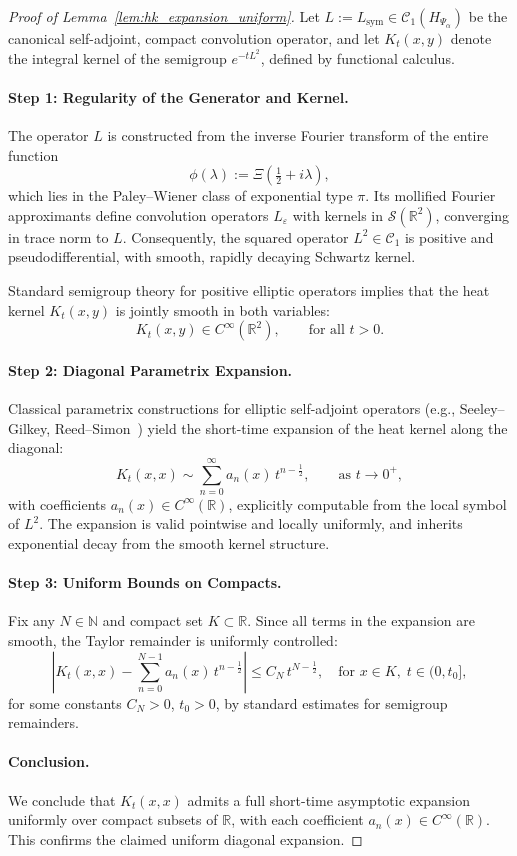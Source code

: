 \begin{proof}[Proof of Lemma~\ref{lem:hk_expansion_uniform}]
Let \( L := L_{\mathrm{sym}} \in \mathcal{C}_1(H_{\Psi_\alpha}) \) be the canonical self-adjoint, compact convolution operator, and let \( K_t(x,y) \) denote the integral kernel of the semigroup \( e^{-tL^2} \), defined by functional calculus.

\paragraph{Step 1: Regularity of the Generator and Kernel.}
The operator \( L \) is constructed from the inverse Fourier transform of the entire function
\[
\phi(\lambda) := \Xi\left(\tfrac{1}{2} + i\lambda\right),
\]
which lies in the Paley–Wiener class of exponential type \( \pi \). Its mollified Fourier approximants define convolution operators \( L_\varepsilon \) with kernels in \( \mathcal{S}(\mathbb{R}^2) \), converging in trace norm to \( L \). Consequently, the squared operator \( L^2 \in \mathcal{C}_1 \) is positive and pseudodifferential, with smooth, rapidly decaying Schwartz kernel.

Standard semigroup theory for positive elliptic operators implies that the heat kernel \( K_t(x,y) \) is jointly smooth in both variables:
\[
K_t(x,y) \in C^\infty(\mathbb{R}^2), \qquad \text{for all } t > 0.
\]

\paragraph{Step 2: Diagonal Parametrix Expansion.}
Classical parametrix constructions for elliptic self-adjoint operators (e.g., Seeley–Gilkey, Reed–Simon~\cite{ReedSimon1978IV}) yield the short-time expansion of the heat kernel along the diagonal:
\[
K_t(x,x) \sim \sum_{n=0}^\infty a_n(x) \, t^{n - \frac{1}{2}}, \qquad \text{as } t \to 0^+,
\]
with coefficients \( a_n(x) \in C^\infty(\mathbb{R}) \), explicitly computable from the local symbol of \( L^2 \). The expansion is valid pointwise and locally uniformly, and inherits exponential decay from the smooth kernel structure.

\paragraph{Step 3: Uniform Bounds on Compacts.}
Fix any \( N \in \mathbb{N} \) and compact set \( K \subset \mathbb{R} \). Since all terms in the expansion are smooth, the Taylor remainder is uniformly controlled:
\[
\left| K_t(x,x) - \sum_{n=0}^{N-1} a_n(x)\, t^{n - \frac{1}{2}} \right| \le C_N\, t^{N - \frac{1}{2}}, \quad \text{for } x \in K, \; t \in (0, t_0],
\]
for some constants \( C_N > 0 \), \( t_0 > 0 \), by standard estimates for semigroup remainders.

\paragraph{Conclusion.}
We conclude that \( K_t(x,x) \) admits a full short-time asymptotic expansion uniformly over compact subsets of \( \mathbb{R} \), with each coefficient \( a_n(x) \in C^\infty(\mathbb{R}) \). This confirms the claimed uniform diagonal expansion.
\end{proof}

